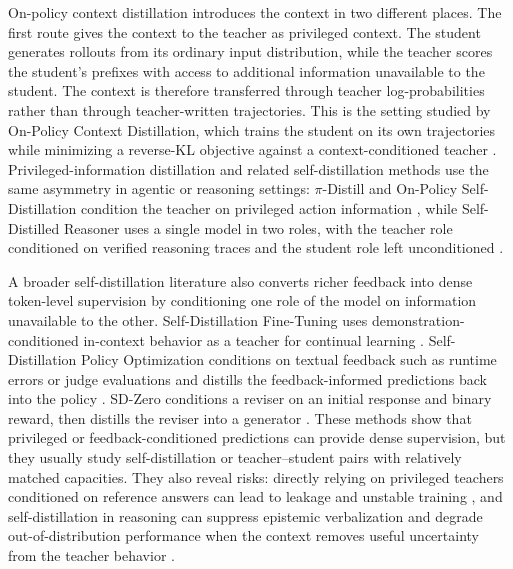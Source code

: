 On-policy context distillation introduces the context in two different places. The first route gives the context to the teacher as privileged context. The student generates rollouts from its ordinary input distribution, while the teacher scores the student's prefixes with access to additional information unavailable to the student. The context is therefore transferred through teacher log-probabilities rather than through teacher-written trajectories. This is the setting studied by On-Policy Context Distillation, which trains the student on its own trajectories while minimizing a reverse-KL objective against a context-conditioned teacher \citep{yeOnPolicyContextDistillation2026}. Privileged-information distillation and related self-distillation methods use the same asymmetry in agentic or reasoning settings: $\pi$-Distill and On-Policy Self-Distillation condition the teacher on privileged action information \citep{penalozaPrivilegedInformationDistillation2026}, while Self-Distilled Reasoner uses a single model in two roles, with the teacher role conditioned on verified reasoning traces and the student role left unconditioned \citep{zhaoSelfDistilledReasonerOnPolicy2026}.

A broader self-distillation literature also converts richer feedback into dense token-level supervision by conditioning one role of the model on information unavailable to the other. Self-Distillation Fine-Tuning uses demonstration-conditioned in-context behavior as a teacher for continual learning \citep{shenfeldSelfDistillationEnablesContinual2026}. Self-Distillation Policy Optimization conditions on textual feedback such as runtime errors or judge evaluations and distills the feedback-informed predictions back into the policy \citep{hubotterReinforcementLearningSelfDistillation2026}. SD-Zero conditions a reviser on an initial response and binary reward, then distills the reviser into a generator \citep{heSelfDistillationZeroSelfRevision2026}. These methods show that privileged or feedback-conditioned predictions can provide dense supervision, but they usually study self-distillation or teacher--student pairs with relatively matched capacities. They also reveal risks: directly relying on privileged teachers conditioned on reference answers can lead to leakage and unstable training \citep{yangSelfDistilledRLVR2026,yangSelfDistilledRLVR2026a}, and self-distillation in reasoning can suppress epistemic verbalization and degrade out-of-distribution performance when the context removes useful uncertainty from the teacher behavior \citep{kimWhyDoesSelfDistillation2026}.

